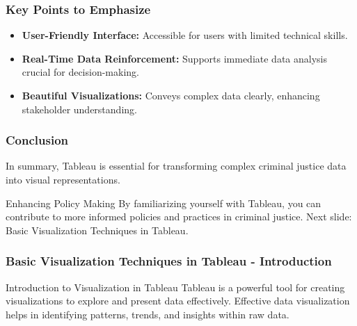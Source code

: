 \documentclass[aspectratio=169]{beamer}
\begin{document}
\begin{frame}[fragile]
    \frametitle{Key Points to Emphasize}
    \begin{itemize}
        \item \textbf{User-Friendly Interface:} Accessible for users with limited technical skills.
        \item \textbf{Real-Time Data Reinforcement:} Supports immediate data analysis crucial for decision-making.
        \item \textbf{Beautiful Visualizations:} Conveys complex data clearly, enhancing stakeholder understanding.
    \end{itemize}
\end{frame}

\begin{frame}[fragile]
    \frametitle{Conclusion}
    In summary, Tableau is essential for transforming complex criminal justice data into visual representations.
    \begin{block}{Enhancing Policy Making}
        By familiarizing yourself with Tableau, you can contribute to more informed policies and practices in criminal justice.
        \newline
        Next slide: Basic Visualization Techniques in Tableau.
    \end{block}
\end{frame}

\begin{frame}[fragile]
    \frametitle{Basic Visualization Techniques in Tableau - Introduction}
    \begin{block}{Introduction to Visualization in Tableau}
        Tableau is a powerful tool for creating visualizations to explore and present data effectively. 
        Effective data visualization helps in identifying patterns, trends, and insights within raw data.
    \end{block}
\end{frame}
\end{document}
